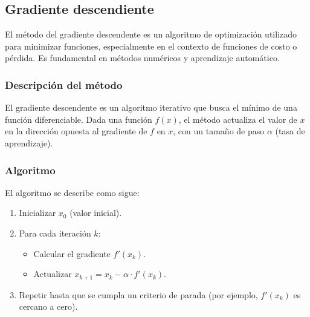 \documentclass[12pt, a4paper]{article}
\theoremstyle{rioplatense}
\begin{document}
\subsection{Gradiente descendiente}

El método del gradiente descendente es un algoritmo de optimización utilizado para minimizar funciones, especialmente en el contexto de funciones de costo o pérdida. Es fundamental en métodos numéricos y aprendizaje automático.

\subsubsection{Descripción del método}
El gradiente descendente es un algoritmo iterativo que busca el mínimo de una función diferenciable. Dada una función $f(x)$, el método actualiza el valor de $x$ en la dirección opuesta al gradiente de $f$ en $x$, con un tamaño de paso $\alpha$ (tasa de aprendizaje).

\subsubsection{Algoritmo}
El algoritmo se describe como sigue:
\begin{enumerate}
    \item Inicializar $x_0$ (valor inicial).
    \item Para cada iteración $k$: 
    \begin{itemize}
        \item Calcular el gradiente $f'(x_k)$.
        \item Actualizar $x_{k+1} = x_k - \alpha \cdot f'(x_k)$.
    \end{itemize}
    \item Repetir hasta que se cumpla un criterio de parada (por ejemplo, $f'(x_k)$ es cercano a cero).
\end{enumerate}
\end{document}

